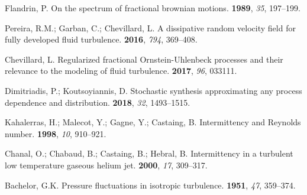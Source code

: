 \documentclass[aps,pra,groupedaddress,notitlepage]{revtex4-1}
\begin{document}
\begin{thebibliography}{999}
Flandrin, P.
\newblock On the spectrum of fractional brownian motions.
  \textbf{1989}, \emph{35}, 197--199.

Pereira, R.M.; Garban, C.; Chevillard, L.
\newblock A dissipative random velocity field for fully developed fluid
  turbulence.
  \textbf{2016}, \emph{794},  369--408.

Chevillard, L.
\newblock Regularized fractional {O}rnstein-{U}hlenbeck processes and their
  relevance to the modeling of fluid turbulence.
  \textbf{2017}, \emph{96},  033111.

Dimitriadis, P.; Koutsoyiannis, D.
\newblock Stochastic synthesis approximating any process dependence and
  distribution.
  \textbf{2018},
  \emph{32},  1493--1515.

Kahalerras, H.; Malecot, Y.; Gagne, Y.; Castaing, B.
\newblock Intermittency and {R}eynolds number.
  \textbf{1998}, \emph{10},   910--921.

Chanal, O.; Chabaud, B.; Castaing, B.; Hebral, B.
\newblock Intermittency in a turbulent low temperature gaseous helium jet.
  \textbf{2000}, \emph{17},  309--317.

Bachelor, G.K.
\newblock Pressure fluctuations in isotropic turbulence.
  \textbf{1951}, \emph{47},  359--374.

\end{thebibliography}



%
%

\end{document}
